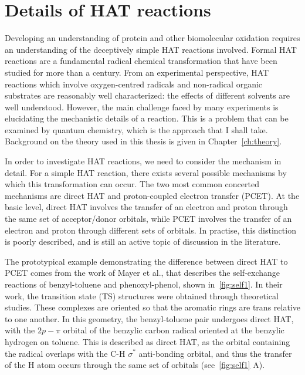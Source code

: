 \section{Details of HAT reactions}

Developing an understanding of protein and other biomolecular oxidation requires an understanding of the deceptively simple HAT reactions involved. Formal HAT reactions are a fundamental radical chemical transformation that have been studied for more than a century.\cite{Kochi1973, Parsons2000} From an experimental perspective, HAT reactions which involve oxygen-centred radicals and non-radical organic substrates are reasonably well characterized: the effects of different solvents are well understood.\cite{Litwinienko2007} However, the main challenge faced by many experiments is elucidating the mechanistic details of a reaction. This is a problem that can be examined by quantum chemistry, which is the approach that I shall take. Background on the theory used in this thesis is given in Chapter~\ref{ch:theory}.

In order to investigate HAT reactions, we need to consider the mechanism in detail. For a simple HAT reaction, there exists several possible mechanisms by which this transformation can occur. The two most common concerted mechanisms are direct HAT and proton-coupled electron transfer (PCET). At the basic level, direct HAT involves the transfer of an electron and proton through the same set of acceptor/donor orbitals, while PCET involves the transfer of an electron and proton through different sets of orbitals. In practise, this distinction is poorly described, and is still an active topic of discussion in the literature.\cite{Cukier1998, Mayer2002, Stubbe2003, Mayer2004, DiLabio2007, Huynh2007, HammesSchiffer2008, Mayer2010, Weinberg2012, HammesSchiffer2015, MunozRugeles2017}

The prototypical example demonstrating the difference between direct HAT to PCET comes from the work of Mayer et al.,\cite{Mayer2002} that describes the self-exchange reactions of benzyl-toluene and phenoxyl-phenol, shown in~\ref{fig:self1}. In their work, the transition state (TS) structures were obtained through theoretical studies. These complexes are oriented so that the aromatic rings are trans relative to one another. In this geometry, the benzyl-toluene pair undergoes direct HAT, with the $2p-\pi$ orbital of the benzylic carbon radical oriented at the benzylic hydrogen on toluene. This is described as direct HAT, as the orbital containing the radical overlaps with the C-H $\sigma^*$ anti-bonding orbital, and thus the transfer of the H atom occurs through the same set of orbitals (see~\ref{fig:self1} A).

